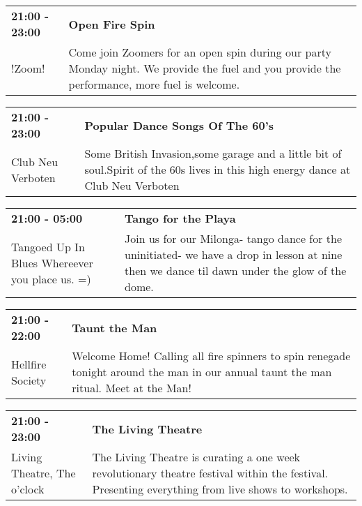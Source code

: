 \begin{tabular}{ p{1in} p{2.2in} }
    \textbf{21:00 - 23:00} & \textbf{Open Fire Spin} \\
    !Zoom! \newline  & Come join Zoomers for an open spin during our party Monday night.  We provide the fuel and you provide the performance, more fuel is welcome. \\
    \hline 
\end{tabular}
    
\begin{tabular}{ p{1in} p{2.2in} }
    \textbf{21:00 - 23:00} & \textbf{Popular Dance Songs Of The 60's  } \\
    Club Neu Verboten \newline  & Some British Invasion,some garage and a little bit of soul.Spirit of the 60s lives in this high energy dance at Club Neu Verboten \\
    \hline 
\end{tabular}
    
\begin{tabular}{ p{1in} p{2.2in} }
    \textbf{21:00 - 05:00} & \textbf{Tango for the Playa} \\
    Tangoed Up In Blues \newline Whereever you place us. =) & Join us for our Milonga- tango dance for the uninitiated- we have a drop in lesson at nine then we dance til dawn under the glow of the dome. \\
    \hline 
\end{tabular}
    
\begin{tabular}{ p{1in} p{2.2in} }
    \textbf{21:00 - 22:00} & \textbf{Taunt the Man} \\
    Hellfire Society \newline  & Welcome Home! Calling all fire spinners to spin renegade tonight around the man in our annual taunt the man ritual. Meet at the Man! \\
    \hline 
\end{tabular}
    
\begin{tabular}{ p{1in} p{2.2in} }
    \textbf{21:00 - 23:00} & \textbf{The Living Theatre} \\
    Living Theatre, The \newline 6 o'clock & The Living Theatre is curating a one week revolutionary theatre festival within the festival. Presenting everything from live shows to workshops. \\
    \hline 
\end{tabular}
    
